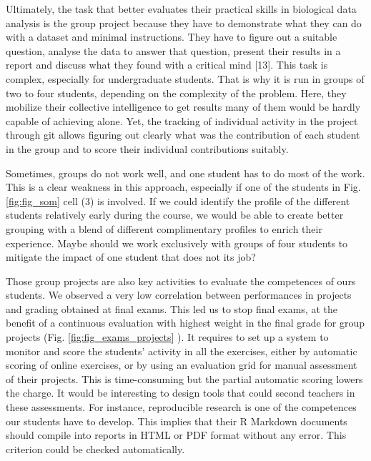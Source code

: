 \documentclass{aims}
\theoremstyle{definition}
\begin{document}
Ultimately, the task that better evaluates their practical skills in
biological data analysis is the group project because they have to
demonstrate what they can do with a dataset and minimal instructions.
They have to figure out a suitable question, analyse the data to answer
that question, present their results in a report and discuss what they
found with a critical mind {[}13{]}. This task is complex, especially
for undergraduate students. That is why it is run in groups of two to
four students, depending on the complexity of the problem. Here, they
mobilize their collective intelligence to get results many of them would
be hardly capable of achieving alone. Yet, the tracking of individual
activity in the project through git allows figuring out clearly what was
the contribution of each student in the group and to score their
individual contributions suitably.

Sometimes, groups do not work well, and one student has to do most of
the work. This is a clear weakness in this approach, especially if one
of the students in Fig. \ref {fig:fig_som} cell (3) is involved. If we
could identify the profile of the different students relatively early
during the course, we would be able to create better grouping with a
blend of different complimentary profiles to enrich their experience.
Maybe should we work exclusively with groups of four students to
mitigate the impact of one student that does not its job?

Those group projects are also key activities to evaluate the competences
of ours students. We observed a very low correlation between
performances in projects and grading obtained at final exams. This led
us to stop final exams, at the benefit of a continuous evaluation with
highest weight in the final grade for group projects (Fig.
\ref {fig:fig_exams_projects} ). It requires to set up a system to
monitor and score the students' activity in all the exercises, either by
automatic scoring of online exercises, or by using an evaluation grid
for manual assessment of their projects. This is time-consuming but the
partial automatic scoring lowers the charge. It would be interesting to
design tools that could second teachers in these assessments. For
instance, reproducible research is one of the competences our students
have to develop. This implies that their R Markdown documents should
compile into reports in HTML or PDF format without any error. This
criterion could be checked automatically.
\end{document}
